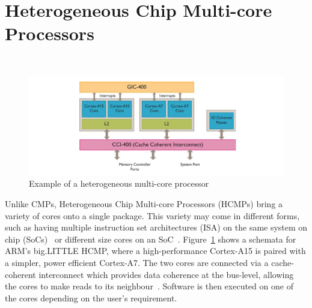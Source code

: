 \section{Heterogeneous Chip Multi-core Processors}~\label{sec:hcmp}

\begin{figure}[t]
 \center
 \includegraphics[width=1\textwidth]{background/graphics/biglittle.png}
 	\vspace{-3em}

 \caption{Example of a heterogeneous multi-core processor~\cite{armbig}}\label{fig:blarm}
\end{figure}
\vspace{-1em}

Unlike CMPs, Heterogeneous Chip Multi-core Processors (HCMPs) bring a variety of cores onto a single package.
This variety may come in different forms, such as having multiple instruction set architectures (ISA) on the same system on chip (SoCs)~\cite{venkat2014harnessingisa,venkatHipstr2016} or different size cores on an SoC~\cite{armbig,jeff2012big}.
Figure~\ref{fig:blarm} shows a schemata for ARM's big.LITTLE HCMP, where a high-performance Cortex-A15 is paired with a simpler, power efficient Cortex-A7.
The two cores are connected via a cache-coherent interconnect which provides data coherence at the bus-level, allowing the cores to make reads to its neighbour~\cite{armbig}.
Software is then executed on one of the cores depending on the user's requirement.


